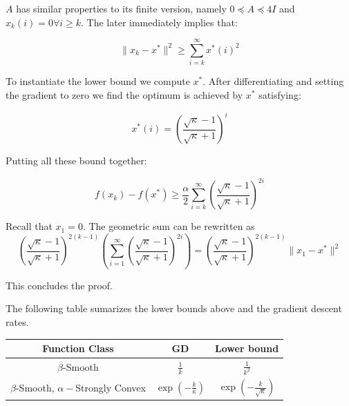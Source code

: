 $A$ has similar properties to its finite version, namely $0 \preceq A \preceq 4I$ and $x_k(i) =0 \forall i \geq k$. The later immediately implies that: 

\begin{equation}
\parallel x_k - x^* \parallel^2 \geq \sum_{i=k}^\infty x^*(i)^2
\end{equation}

To instantiate the lower bound we compute $x^*$. After differentiating and setting the gradient to zero we find the optimum is achieved by $x^*$ satisfying:

\begin{equation}
x^*(i) = \left( \frac{\sqrt{\kappa} - 1}{\sqrt{\kappa} +1} \right)^i 
\end{equation}

Putting all these bound together:

\begin{equation}
f(x_k) - f(x^*) \geq \frac{\alpha}{2}\sum_{i=k}^\infty \left( \frac{\sqrt{\kappa} - 1}{\sqrt{\kappa} +1} \right)^{2i} 
\end{equation}

Recall that $x_1 =0$. The geometric sum can be rewritten as 
\begin{equation}
\left( \frac{\sqrt{\kappa} - 1}{\sqrt{\kappa} +1} \right)^{2(k-1)} \left( \sum_{i=1}^\infty \left( \frac{\sqrt{\kappa} - 1}{\sqrt{\kappa} +1} \right)^{2i} \right) = \left( \frac{\sqrt{\kappa} - 1}{\sqrt{\kappa} +1} \right)^{2(k-1)} \parallel x_1 - x^* \parallel^2
\end{equation}

This concludes the proof.

\proofend

The following table sumarizes the lower bounds above and the gradient descent rates. 

\begin{center}


 \begin{tabular}{||c c c ||} 
 \hline
 Function Class   & GD  & Lower bound \\ [0.5ex] 
 \hline\hline
 $\beta$-Smooth & $\frac{1}{k}$ &  $\frac{1}{k^2}$\\ [1ex]
 \hline
 $\beta$-Smooth, $\alpha-$Strongly Convex  &  $\exp\left(-\frac{k}{\kappa}\right)$ &  $\exp\left(-\frac{k}{\sqrt{\kappa}}  \right)$ \\ [1ex]
 \hline
\end{tabular}



\end{center}

